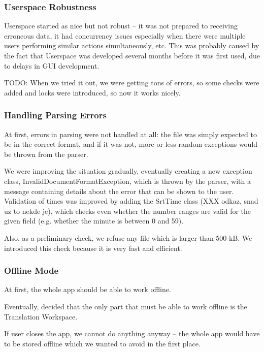 \subsubsection{Userspace Robustness}

Userspace started as nice but not robust -- it was not prepared to receiving erroneous data, it had concurrency issues especially when there were multiple users performing similar actions simultaneously, etc. This was probably caused by the fact that Userspace was developed several months before it was first used, due to delays in GUI development.

TODO: When we tried it out, we were getting tons of errors, so some checks were added and locks were introduced, so now it works nicely.

\subsubsection{Handling Parsing Errors}

At first, errors in parsing were not handled at all: the file was simply expected to be in the correct format, and if it was not, more or less random exceptions would be thrown from the parser.

We were improving the situation gradually, eventually creating a new exception class, InvalidDocumentFormatException, which is thrown by the parser, with a message containing details about the error that can be shown to the user.
Validation of times was improved by adding the SrtTime class (XXX odkaz, snad uz to nekde je), which checks even whether the number ranges are valid for the given field (e.g. whether the minute is between 0 and 59).

Also, as a preliminary check, we refuse any file which is larger than 500 kB. We introduced this check because it is very fast and efficient.

\subsubsection{Offline Mode}

At first, the whole app should be able to work offline.

Eventually, decided that the only part that must be able to work offline is the Translation Workspace.

If user closes the app, we cannot do anything anyway -- the whole app would have to be stored offline which we wanted to avoid in the first place.

